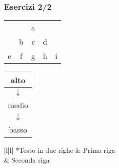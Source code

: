 \begin{frame}
 
 \frametitle{Esercizi 2/2}

  \begin{centering}

  \begin{tabular}{|c|c|c|c|c|}
   \cline{3-3}
   \multicolumn{2}{c|}{} & a & \multicolumn{2}{c}{}\\
   \cline{2-4}
   \multicolumn{1}{c|}{} & b & c & d & \multicolumn{1}{c}{}\\
   \hline
   e & f & g & h & i\\
   \hline
  \end{tabular}
  \vspace{0,8cm}

  \begin{tabular}{c}
   \hline
   \multicolumn{1}{|c|}{alto}\\
   \hline
   $\downarrow$\\
   \hline
   \multicolumn{1}{|c|}{medio}\\
   \hline
   $\downarrow$\\
   \hline
   \multicolumn{1}{|c|}{basso}\\
   \hline
  \end{tabular}
  \vspace{0,8cm}

  \begin{tabular}{|l|l|}
   \hline
   *{Testo in due righe} & Prima riga \\
   & Seconda riga\\
   \hline
  \end{tabular}

  \end{centering}

\end{frame}

